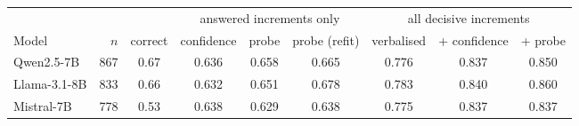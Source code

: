 \begin{tabular}{lrccccccc}
\toprule
& & & \multicolumn{3}{c}{answered increments only} & \multicolumn{3}{c}{all decisive increments} \\
\cmidrule(lr){4-6}\cmidrule(lr){7-9}
Model & $n$ & correct & confidence & probe & probe (refit) & verbalised & + confidence & + probe \\
\midrule
Qwen2.5-7B & 867 & 0.67 & 0.636 & 0.658 & 0.665 & 0.776 & 0.837 & 0.850 \\
Llama-3.1-8B & 833 & 0.66 & 0.632 & 0.651 & 0.678 & 0.783 & 0.840 & 0.860 \\
Mistral-7B & 778 & 0.53 & 0.638 & 0.629 & 0.638 & 0.775 & 0.837 & 0.837 \\
\bottomrule
\end{tabular}